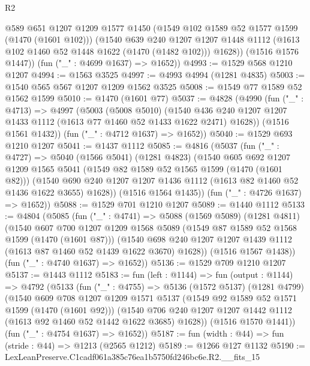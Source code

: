 \begin{lexlean}{R2}
\begin{coremodule}
          @589
          @651
          @1207
          @1209
          @1577
          @1450
          (@1549 @102 @1589 @52 @1577 @1599 (@1470 (@1601 @102)))
          (@1540
            @639
            @240
            @1207
            @1207
            @1448
            @1112
            (@1613 @102 @1460 @52 @1448 @1622 (@1470 (@1482 @102)))
            @1628))
        (@1516 @1576 @1447))
      (fun ("_" : @4699 @1637) => @1652))
@4993 := @1529 @568 @1210 @1207
@4994 := @1563 @3525
@4997 := @4993 @4994 (@1281 @4835)
@5003 := @1540 @565 @567 @1207 @1209 @1562 @3525
@5008 := @1549 @77 @1589 @52 @1562 @1599
@5010 := @1470 (@1601 @77)
@5037 := @4828
    (@4990
      (fun ("_" : @4713) =>
      @4997
        (@5003
          (@5008 @5010)
          (@1540 @436 @240 @1207 @1207 @1433 @1112 (@1613 @77 @1460 @52 @1433 @1622 @2471) @1628))
        (@1516 @1561 @1432))
      (fun ("_" : @4712 @1637) => @1652))
@5040 := @1529 @693 @1210 @1207
@5041 := @1437 @1112
@5085 := @4816
    (@5037
      (fun ("_" : @4727) =>
      @5040
        (@1566 @5041)
        (@1281 @4823)
        (@1540
          @605
          @692
          @1207
          @1209
          @1565
          @5041
          (@1549 @82 @1589 @52 @1565 @1599 (@1470 (@1601 @82)))
          (@1540 @690 @240 @1207 @1207 @1436 @1112 (@1613 @82 @1460 @52 @1436 @1622 @3655) @1628))
        (@1516 @1564 @1435))
      (fun ("_" : @4726 @1637) => @1652))
@5088 := @1529 @701 @1210 @1207
@5089 := @1440 @1112
@5133 := @4804
    (@5085
      (fun ("_" : @4741) =>
      @5088
        (@1569 @5089)
        (@1281 @4811)
        (@1540
          @607
          @700
          @1207
          @1209
          @1568
          @5089
          (@1549 @87 @1589 @52 @1568 @1599 (@1470 (@1601 @87)))
          (@1540 @698 @240 @1207 @1207 @1439 @1112 (@1613 @87 @1460 @52 @1439 @1622 @3670) @1628))
        (@1516 @1567 @1438))
      (fun ("_" : @4740 @1637) => @1652))
@5136 := @1529 @709 @1210 @1207
@5137 := @1443 @1112
@5183 := fun (left : @1144) =>
  fun (output : @1144) =>
  @4792
    (@5133
      (fun ("_" : @4755) =>
      @5136
        (@1572 @5137)
        (@1281 @4799)
        (@1540
          @609
          @708
          @1207
          @1209
          @1571
          @5137
          (@1549 @92 @1589 @52 @1571 @1599 (@1470 (@1601 @92)))
          (@1540 @706 @240 @1207 @1207 @1442 @1112 (@1613 @92 @1460 @52 @1442 @1622 @3685) @1628))
        (@1516 @1570 @1441))
      (fun ("_" : @4754 @1637) => @1652))
@5187 := fun (width : @44) => fun (stride : @44) => @1213 (@2565 @1212)
@5189 := @1266 @127 @1132
@5190 := LexLeanPreserve.C1cadf061a385c76ea1b5750fd246bc6e.R2.__fits_15

\end{coremodule}
\end{lexlean}
